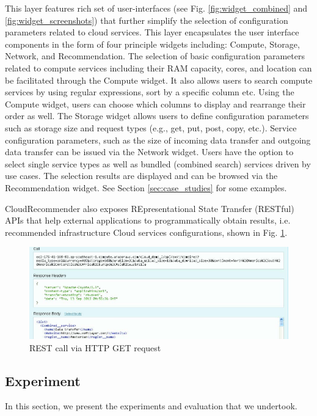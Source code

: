 This layer features rich set of user-interfaces (see Fig. \ref{fig:widget_combined}
and \ref{fig:widget_screenshots})
that further simplify the selection of configuration parameters related to cloud services.
This layer encapsulates the user interface components in the form of four principle widgets including: Compute, Storage, Network, and Recommendation. The selection of basic configuration parameters related to compute services including their RAM capacity, cores, and location can be facilitated through the Compute widget. It also allows users to search compute services by using regular expressions, sort by a specific column etc. Using the Compute widget, users can choose which columns to display and rearrange their order as well. The Storage widget allows users to define configuration parameters such as storage size and request types (e.g., get, put, post, copy, etc.). Service configuration parameters, such as the size of incoming data transfer and outgoing data transfer can be issued via the Network widget. Users have the option to select single service types as well as bundled (combined search) services driven by use cases. The selection results are displayed and can be browsed via the Recommendation widget.
See Section \ref{sec:case_studies} for some examples.

CloudRecommender also exposes REpresentational State
Transfer (RESTful) APIs that help external applications to
programmatically obtain results, i.e. recommended
infrastructure Cloud services configurations, shown in Fig. \ref{fig:REST}.

\begin{figure}[!ht]
  \includegraphics[width=\textwidth,keepaspectratio]{Figures/system/CloudRecommender/REST.jpg}
  \caption{REST call via HTTP GET request}
  \label{fig:REST}
\end{figure}

\subsection{Experiment}
In this section, we present the experiments and evaluation that we undertook.

